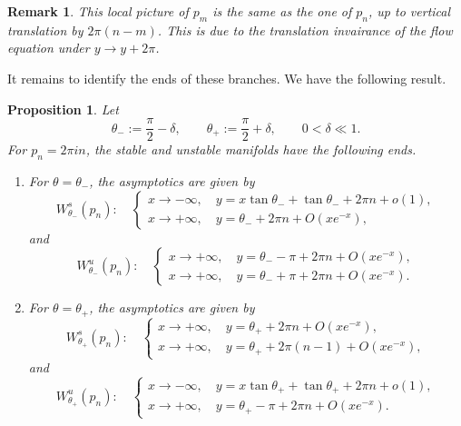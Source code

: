 \documentclass[11pt]{amsart}
\theoremstyle{plain}
\newtheorem{prop}[thm]{Proposition}
\newtheorem{rmk}[thm]{Remark}
\begin{document}
\begin{rmk}
This local picture of $p_m$ is the same as the one of $p_n$, up to vertical translation by \(2\pi (n-m)\). This is due to the translation invairance of the flow equation under $y\to y+2\pi$.    
\end{rmk}

It remains to identify the ends of these branches. We have the following result.

\begin{prop}
\label{prop:gamma-generic-endpoints-W}
Let
\[
\theta_-:=\frac{\pi}{2}-\delta,
\qquad
\theta_+:=\frac{\pi}{2}+\delta,
\qquad
0<\delta\ll1.
\]
For \(p_n=2\pi i n\), the stable and unstable manifolds have the following ends.
\begin{enumerate}
\item For \(\theta=\theta_-\), the asymptotics are given by
\[
W^s_{\theta_-}(p_n):
\quad
\begin{cases}
x\to-\infty,\quad y=x\tan\theta_-+\tan\theta_-+2\pi n+o(1),\\[0.1cm]
x\to+\infty,\quad y=\theta_-+2\pi n+O(xe^{-x}),
\end{cases}
\]
and
\[
W^u_{\theta_-}(p_n):
\quad
\begin{cases}
x\to+\infty,\quad y=\theta_- -\pi+2\pi n+O(xe^{-x}),\\[0.1cm]
x\to+\infty,\quad y=\theta_- +\pi+2\pi n+O(xe^{-x}).
\end{cases}
\]
\item For \(\theta=\theta_+\), the asymptotics are given by
\[
W^s_{\theta_+}(p_n):
\quad
\begin{cases}
x\to+\infty,\quad y=\theta_+ +2\pi n+O(xe^{-x}),\\[0.1cm]
x\to+\infty,\quad y=\theta_+ +2\pi(n-1)+O(xe^{-x}),
\end{cases}
\]
and
\[
W^u_{\theta_+}(p_n):
\quad
\begin{cases}
x\to-\infty,\quad y=x\tan\theta_+ +\tan\theta_+ +2\pi n+o(1),\\[0.1cm]
x\to+\infty,\quad y=\theta_+-\pi+2\pi n+O(xe^{-x}).
\end{cases}
\]
\end{enumerate}
\end{prop}
\end{document}
